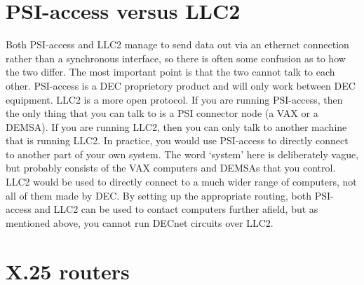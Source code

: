 \section{PSI-access versus LLC2}

Both PSI-access and LLC2 manage to send data out via an ethernet connection
rather than a synchronous interface, so there is often some confusion as to how
the two differ. The most important point is that the two cannot talk to each
other. PSI-access is a DEC proprietory product and will only work between DEC
equipment. LLC2 is a more open protocol. If you are running PSI-access, then
the only thing that you can talk to is a PSI connector node (a VAX or a DEMSA).
If you are running LLC2, then you can only talk to another machine that is
running LLC2. In practice, you would use PSI-access to directly connect to
another part of your own system. The word `system' here is deliberately vague,
but probably consists of the VAX computers and DEMSAs that you control. LLC2
would be used to directly connect to a much wider range of computers, not all
of them made by DEC. By setting up the appropriate routing, both PSI-access and
LLC2 can be used to contact computers further afield, but as mentioned above,
you cannot run DECnet circuits over LLC2.

\section{X.25 routers}

